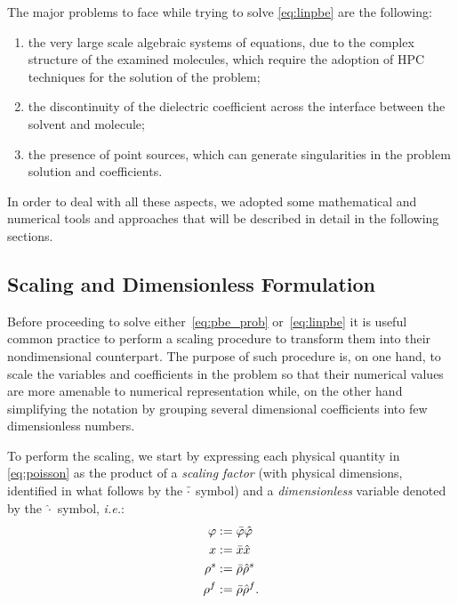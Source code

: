 \documentclass[11pt,a4paper]{article}
\begin{document}
The major problems to face while trying to solve \eqref{eq:linpbe} are the following:
\begin{enumerate}
    \item the very large scale algebraic systems of equations, due to the complex structure of the examined molecules, which require the adoption of HPC techniques for the solution of the problem;
    \item the discontinuity of the dielectric coefficient across the interface between the solvent and molecule;
    \item the presence of point sources, which can generate singularities in the problem solution and coefficients.
\end{enumerate}
In order to deal with all these aspects, we adopted some mathematical and numerical tools and approaches that will be described in detail in the following sections. 

\subsection{Scaling and Dimensionless Formulation}
\label{sec:dimensionless_form}

Before proceeding to solve either~\eqref{eq:pbe_prob} or~\eqref{eq:linpbe} it is useful 
common practice to perform a scaling procedure to transform them into their nondimensional 
counterpart. The purpose of such procedure is, on one hand, to scale the variables and coefficients
in the problem so that their numerical values are more amenable to numerical representation while,
on the other hand simplifying the notation by grouping several dimensional coefficients into
few dimensionless numbers.

To perform the scaling, we start by  expressing each physical quantity in \eqref{eq:poisson} 
as the product of a \emph{scaling factor} (with physical dimensions, identified in what follows 
by the  $\Bar{\cdot}$ symbol) and a \emph{dimensionless} 
variable denoted by the $\hat{\cdot}$ symbol, {\it i.e.}:
\begin{equation}
\begin{aligned}
    \label{scalingfactors}
     \varphi & := \Bar{\varphi}\hat{\varphi} \\
    x & := \Bar{x}\hat{x} \\
     \rho^s & := \Bar{\rho}\hat{\rho}^s \\
    \rho^f & := \Bar{\rho}\hat{\rho}^f.
\end{aligned}
\end{equation}
\end{document}
